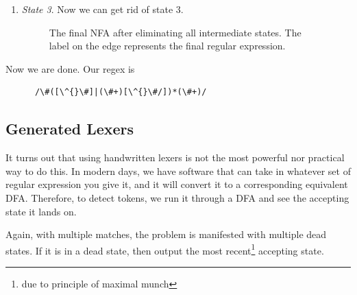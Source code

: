 \begin{example}
\begin{enumerate}
      \item \textit{State 3}. Now we can get rid of state 3. 

        \begin{figure}[H]
          \centering
          \caption{The final NFA after eliminating all intermediate states. The label on the edge represents the final regular expression.}
          \label{fig:final_regex}
        \end{figure}
    \end{enumerate}

    Now we are done. Our regex is 
    \begin{lstlisting}
      /\#([\^{}\#]|(\#+)[\^{}\#/])*(\#+)/ 
    \end{lstlisting}
  \end{example}

\subsection{Generated Lexers}

  It turns out that using handwritten lexers is not the most powerful nor practical way to do this. In modern days, we have software that can take in whatever set of regular expression you give it, and it will convert it to a corresponding equivalent DFA. Therefore, to detect tokens, we run it through a DFA and see the accepting state it lands on. 

  Again, with multiple matches, the problem is manifested with multiple dead states. If it is in a dead state, then output the most recent\footnote{due to principle of maximal munch} accepting state. 

